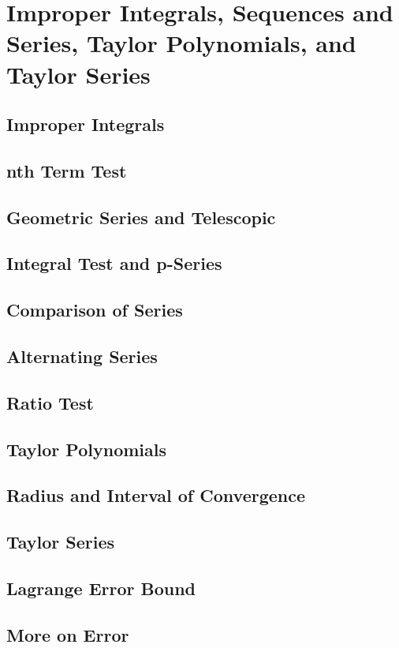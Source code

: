 \documentclass[../bccalc.tex]{subfiles}
\begin{document}
\chapter{Improper Integrals, Sequences and Series, Taylor Polynomials, and Taylor Series}
\section{Improper Integrals}

\section{nth Term Test}

\section{Geometric Series and Telescopic}

\section{Integral Test and p-Series}

\section{Comparison of Series}

\section{Alternating Series}

\section{Ratio Test}

\section{Taylor Polynomials}

\section{Radius and Interval of Convergence}

\section{Taylor Series}

\section{Lagrange Error Bound}

\section{More on Error}
\end{document}
